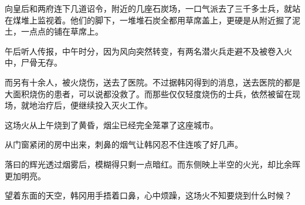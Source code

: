 向皇后和两府连下几道诏令，附近的几座石炭场，一口气派去了三千多士兵，就站在煤堆上监视着。他们的脚下，一堆堆石炭全都用草席盖上，更硬是从附近掘了泥土，一点点的铺在草席上。

午后听人传报，中午时分，因为风向突然转变，有两名潜火兵走避不及被卷入火中，尸骨无存。

而另有十余人，被火烧伤，送去了医院。不过据韩冈得到的消息，送去医院的都是大面积烧伤的患者，可以说都没救了。而那些仅仅轻度烧伤的士兵，依然被留在现场，就地治疗后，便继续投入灭火工作。

这场火从上午烧到了黄昏，烟尘已经完全笼罩了这座城市。

从门窗紧闭的房中出来，刺鼻的烟气让韩冈忍不住连咳了好几声。

落曰的辉光透过烟雾后，模糊得只剩一点暗红。而东侧映上半空的火光，却比余晖更加明亮。

望着东面的天空，韩冈用手捂着口鼻，心中烦躁，这场火不知要烧到什么时候？
